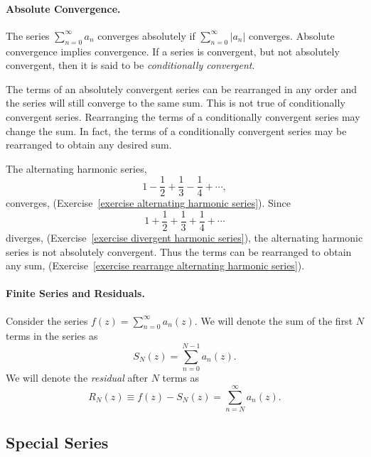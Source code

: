 \paragraph{Absolute Convergence.}
The series $\sum_{n = 0}^\infty a_n$ converges absolutely if $\sum_{n = 0}^\infty |a_n|$
converges.  Absolute convergence implies convergence.  If a series is
convergent, but not absolutely convergent, then it is said to be 
\textit{conditionally convergent}.

The terms of an absolutely convergent series can be rearranged in any order
and the series will still converge to the same sum.  This is not true of
conditionally convergent series.  Rearranging the terms of a conditionally
convergent series may change the sum.  In fact, the terms of a conditionally
convergent series may be rearranged to obtain any desired sum.



\begin{Example}
  The alternating harmonic series,
  \[ 
  1 - \frac{1}{2} + \frac{1}{3} - \frac{1}{4} + \cdots, 
  \]
  converges, (Exercise~\ref{exercise alternating harmonic series}).
  Since
  \[ 
  1 + \frac{1}{2} + \frac{1}{3} + \frac{1}{4} + \cdots 
  \]
  diverges, (Exercise~\ref{exercise divergent harmonic series}),
  the alternating harmonic series is not absolutely convergent.
  Thus the terms can be rearranged to obtain any sum,
  (Exercise~\ref{exercise rearrange alternating harmonic series}).
\end{Example}






\paragraph{Finite Series and Residuals.}
Consider the series $f(z) = \sum_{n = 0}^\infty a_n(z)$.  We will denote the sum 
of the first $N$ terms in the series as
\[ 
S_N(z) = \sum_{n=0}^{N-1} a_n(z).
\]
We will denote the \textit{residual} after $N$ terms as
\[ 
R_N(z) \equiv f(z) - S_N(z) = \sum_{n=N}^\infty a_n(z).
\]









\subsection{Special Series}




